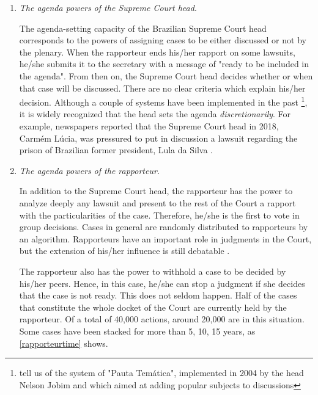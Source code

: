 \documentclass[12pt, a4paper]{article}
\begin{document}
\begin{enumerate}
\item \emph{The agenda powers of the Supreme Court head}.

The agenda-setting capacity of the Brazilian Supreme Court head 
corresponds to the powers of assigning cases to be either discussed or not by the plenary.  When the rapporteur ends his/her rapport on some lawsuits, he/she submits it to the secretary with a message of "ready to be included in the agenda". From then on, the Supreme Court head decides whether or when that case will be discussed. There are no clear criteria which explain his/her decision. Although a couple of systems have been implemented in the past \footnote{\citet{falcao2013stf} tell us of the system of "Pauta Temática", implemented in 2004 by the head Nelson Jobim and which aimed at adding popular subjects to discussions}, it is widely recognized that the head sets the agenda \emph{discretionarily}. For example, newspapers reported that the Supreme Court head in 2018, Carmém Lúcia, was pressured to put in discussion a lawsuit regarding the prison of Brazilian former president, Lula da Silva \citep{carmenluciapauta}.


\item \emph{The agenda powers of the rapporteur}.

In addition to the Supreme Court head, the rapporteur has the power to analyze deeply any lawsuit and present to the rest of the Court a rapport with the particularities of the case. Therefore, he/she is the first to vote in group decisions. Cases in general are randomly distributed to rapporteurs by an algorithm. Rapporteurs have an important role in judgments in the Court, but the extension of his/her influence is still debatable \citep{oliveira2012supremo,silva2015voto, da2016relator,dos2016termos}.

The rapporteur also has the power to withhold a case to be decided by his/her peers. Hence,
in this case, he/she can stop a judgment if she decides that the case is not ready. This does not seldom happen. Half of the cases that constitute the whole docket of the Court are currently held by the rapporteur.
Of a total of 40,000 actions, around 20,000 are in this situation. Some cases have been stacked for more than 5, 10, 15 years, as \autoref{rapporteurtime} shows.


\end{enumerate}
\end{document}
